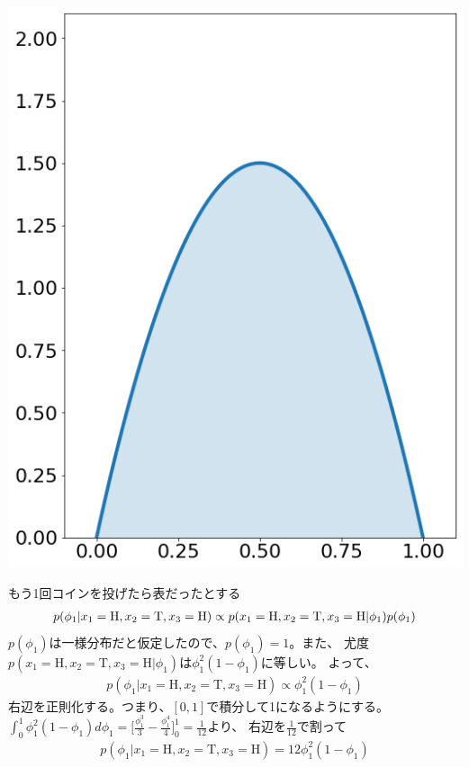 \documentclass[aspectratio=169,unicode,dvipdfmx,14pt]{beamer}
\begin{document}
\begin{frame}
\begin{textblock*}{0.4\linewidth}
    \includegraphics[width=\linewidth]{beta_2_2.png}
\end{textblock*}
\end{frame}

\begin{frame}{もう1回コインを投げたら表だったとする}
\vspace{-.3in}
\begin{align}
p(\phi_1 | x_1 = \mbox{H}, x_2 = \mbox{T}, x_3 = \mbox{H}) 
\propto p(x_1 = \mbox{H}, x_2 = \mbox{T}, x_3 = \mbox{H} | \phi_1) p(\phi_1)
\notag
\end{align}
$p(\phi_1)$は一様分布だと仮定したので、$p(\phi_1)=1$。また、
尤度$p(x_1 = \mbox{H}, x_2 = \mbox{T}, x_3 = \mbox{H} | \phi_1)$は$\phi_1^2(1-\phi_1)$に等しい。
よって、
\begin{align}
p(\phi_1 | x_1 = \mbox{H}, x_2 = \mbox{T}, x_3 = \mbox{H}) \propto \phi_1^2(1-\phi_1)
\end{align}
右辺を正則化する。つまり、$[0,1]$で積分して1になるようにする。
$\int_0^1 \phi_1^2(1-\phi_1) d\phi_1 =\Big[ \frac{\phi_1^3}{3} - \frac{\phi_1^4}{4} \Big]_0^1= \frac{1}{12}$より、
右辺を$\frac{1}{12}$で割って
\begin{align}
p(\phi_1 | x_1 = \mbox{H}, x_2 = \mbox{T}, x_3 = \mbox{H}) = 12\phi_1^2(1-\phi_1)
\end{align}
\end{frame}
\end{document}
